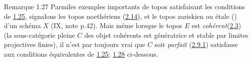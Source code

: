 \begin{enonce*}[remark]{Remarque 1.27}
Parmi\pageoriginale les exemples importants de topos satisfaisant les
conditions de \hyperref[VI.cor1.25]{1.25}, signalons les topos noethériens
(\hyperref[VI.subsec2.14]{2.14}), et le topos zariskien ou étale
() d'un schéma $X$ (\cf IX, note p.42). Mais
même lorsque
le topos $E$ est \emph{cohérent}(\hyperref[VI.def2.3]{2.3}) (\ie la sous-catégorie pleine
$C$ des objet cohérents est génératrice et stable par limites
projectives finies), il n'est par toujours vrai que $C$ soit
\emph{parfait} (\hyperref[VI.def2.9.1]{2.9.1}) \ie satisfasse aux conditions équivalentes de
\hyperref[VI.cor1.25]{1.25}; \cf \hyperref[VI.exer1.28]{1.28} ci-dessous.
\end{enonce*}

